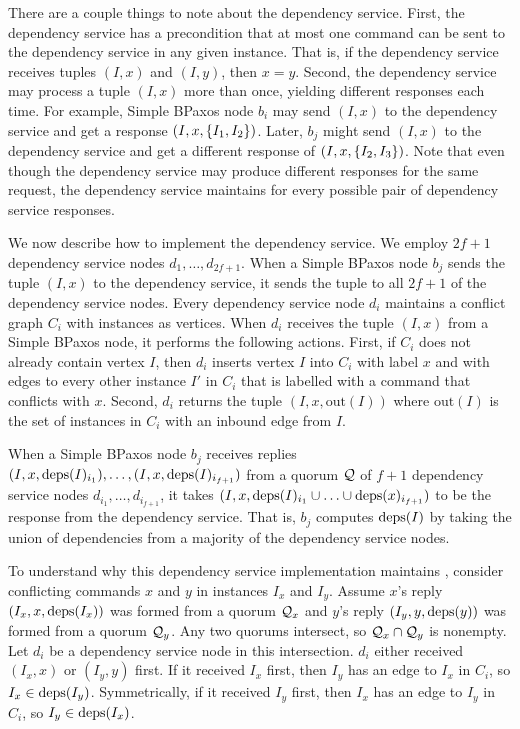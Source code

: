 There are a couple things to note about the dependency service.
%
First, the dependency service has a precondition that at most one command can
be sent to the dependency service in any given instance. That is, if the
dependency service receives tuples $(I, x)$ and $(I, y)$, then $x = y$.
%
Second, the dependency service may process a tuple $(I, x)$ more than once,
yielding different responses each time. For example, Simple BPaxos node $b_i$
may send $(I, x)$ to the dependency service and get a response $(I, x,
\{I_1, I_2\})$. Later, $b_j$ might send $(I, x)$ to the dependency service
and get a different response of $(I, x, \{I_2, I_3\})$. Note that even though
the dependency service may produce different responses for the same request,
the dependency service maintains  for every possible
pair of dependency service responses.

\newcommand{\out}[1]{\text{out}(#1)}
We now describe how to implement the dependency service. We employ $2f + 1$
dependency service nodes $d_{1}, \ldots, d_{2f + 1}$. When a Simple BPaxos node
$b_j$ sends the tuple $(I, x)$ to the dependency service, it sends the tuple to
all $2f + 1$ of the dependency service nodes. Every dependency service node
$d_i$ maintains a conflict graph $C_i$ with instances as vertices. When $d_i$
receives the tuple $(I, x)$ from a Simple BPaxos node, it performs the
following actions.
%
First, if $C_i$ does not already contain vertex $I$, then $d_i$ inserts vertex
$I$ into $C_i$ with label $x$ and with edges to every other instance $I'$ in
$C_i$ that is labelled with a command that conflicts with $x$.
%
Second, $d_i$ returns the tuple $(I, x, \out{I})$ where $\out{I}$ is the set of
instances in $C_i$ with an inbound edge from $I$.

When a Simple BPaxos node $b_j$ receives replies $(I, x, \text{deps}(I)_{i_1}),
\ldots, (I, x, \text{deps}(I)_{i_{f+1}})$ from a quorum $\mathcal{Q}$ of $f + 1$
dependency service nodes $d_{i_1}, \ldots, d_{i_{f+1}}$, it takes $(I, x,
\text{deps}(I)_{i_1} \cup \ldots \cup \text{deps}(x)_{i_{f+1}})$ to be the response from
the dependency service. That is, $b_j$ computes $\text{deps}(I)$ by taking the union
of dependencies from a majority of the dependency service nodes.

To understand why this dependency service implementation maintains
, consider conflicting commands $x$ and $y$ in
instances $I_x$ and $I_y$. Assume $x$'s reply $(I_x, x, \text{deps}(I_x))$ was formed
from a quorum $\mathcal{Q}_x$ and $y$'s reply $(I_y, y, \text{deps}(y))$ was formed from
a quorum $\mathcal{Q}_y$. Any two quorums intersect, so $\mathcal{Q}_x \cap \mathcal{Q}_y$
is nonempty. Let $d_i$ be a dependency service node in this intersection. $d_i$
either received $(I_x, x)$ or $(I_y, y)$ first. If it received $I_x$ first,
then $I_y$ has an edge to $I_x$ in $C_i$, so $I_x \in \text{deps}(I_y)$.
Symmetrically, if it received $I_y$ first, then $I_x$ has an edge to $I_y$ in
$C_i$, so $I_y \in \text{deps}(I_x)$.

